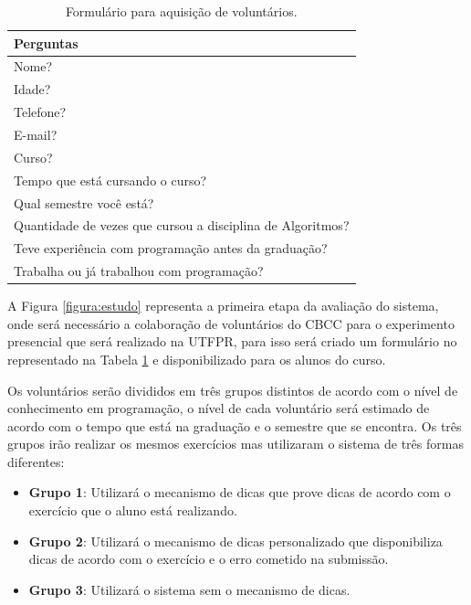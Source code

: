 \begin{table}[ht]
	\centering
	\captionsetup{justification=centering}
	\caption{Formulário para aquisição de voluntários.}
	\label{tabela:formulário}
	\begin{tabular}{l}
		\hline
		Perguntas                        \\ \hline
		Nome?                            \\
		Idade?                           \\
		Telefone?                        \\
		E-mail?                          \\
		Curso?                           \\
		Tempo que está cursando o curso? \\
		Qual semestre você está?         \\ 
		Quantidade de vezes que cursou a disciplina de Algoritmos?  \\ 
		Teve experiência com programação antes da graduação? \\
		Trabalha ou já trabalhou com programação? \\ \hline
	\end{tabular}
\end{table}

A Figura \ref{figura:estudo} representa a primeira etapa da avaliação do sistema, onde será necessário a colaboração de voluntários do CBCC para o experimento presencial que será realizado na UTFPR, para isso será criado um formulário no  representado na Tabela \ref{tabela:formulário} e disponibilizado  para os alunos do curso.

Os voluntários serão divididos em três grupos distintos de acordo com o nível de conhecimento em programação, o nível de cada voluntário será estimado de acordo com o tempo que está na graduação e o semestre que se encontra. Os três grupos irão realizar os mesmos exercícios mas utilizaram o sistema de três formas diferentes:

\begin{itemize}
	\item \textbf{Grupo 1}: Utilizará o mecanismo de dicas que prove dicas de acordo com o exercício que o aluno está realizando.
	
	\item \textbf{Grupo 2}: Utilizará o mecanismo de dicas personalizado que disponibiliza dicas de acordo com o exercício e o erro cometido na submissão.
	
	\item \textbf{Grupo 3}: Utilizará o sistema sem o mecanismo de dicas.
\end{itemize}

